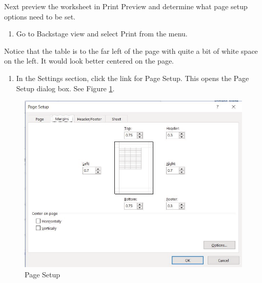 Next preview the worksheet in Print Preview and determine what page setup options need to be set.

\begin{enumerate}
	\item Go to Backstage view and select Print from the menu.
\end{enumerate}

Notice that the table is to the far left of the page with quite a bit of white space on the left. It would look better centered on the page.

\begin{enumerate}
	\item In the Settings section, click the link for Page Setup. This opens the Page Setup dialog box. See Figure \ref{05:fig26}.
\end{enumerate}

\begin{figure}[H]
	\centering
	\includegraphics[width=\maxwidth{.95\linewidth}]{gfx/ch05_fig26}
	\caption{Page Setup}
	\label{05:fig26}
\end{figure}

